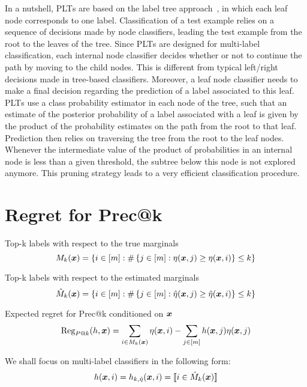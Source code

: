 \documentclass{article}
\newcommand{\Algo}[1]{\textsc{#1}}
\begin{document}
In a nutshell, \Algo{PLT}s are based on the label tree approach~\cite{Beygelzimer_et_al_2009a,Bengio_et_al_2010,Deng_et_al_2011}, in which each leaf node corresponds to one label. Classification of a test example relies on a sequence of decisions made by node classifiers, leading the test example from the root to the leaves of the tree. Since \Algo{PLT}s are designed for multi-label classification, each internal node classifier decides whether or not to continue the path by moving to the child nodes. This is different from typical left/right decisions made in tree-based classifiers.  Moreover, a leaf node classifier needs to make a final decision regarding the prediction of a label associated to this leaf. \Algo{PLT}s use a class probability estimator in each node of the tree, such that an estimate of the posterior probability of a label associated with a leaf is given by the product of the probability estimates on the path from the root to that leaf. Prediction then relies on traversing the tree from the root to the leaf nodes. Whenever the intermediate value of the product of probabilities in an internal node is less than a given threshold, the subtree below this node is not explored anymore. This pruning strategy leads to a very efficient classification procedure. %


\newpage






\appendix

\onecolumn

\section{Regret for Prec@k}
Top-k labels with respect to the true marginals
\[
M_k(\boldsymbol{x}) = \left\{ i\in [m] : \# \left\{ j \in [m] : \eta(\boldsymbol{x}, j) \ge \eta(\boldsymbol{x}, i)  \right\} \le k\right\}
\]

Top-k labels with respect to the estimated marginals
\[
\hat{M}_k(\boldsymbol{x}) = \left\{ i\in [m] : \# \left\{ j \in [m] : \hat{\eta}(\boldsymbol{x}, j) \ge \hat{\eta}(\boldsymbol{x}, i)  \right\} \le k\right\}
\]


Expected regret for Prec@k conditioned on $\boldsymbol{x}$ 
\[
\mbox{Reg}_{P@k} (h, \boldsymbol{x}) = \sum_{i \in M_k(\boldsymbol{x})} \eta (\boldsymbol{x} ,i ) - \sum_{j \in [m]} h(\boldsymbol{x}, j) \eta(\boldsymbol{x} , j )
\]

We shall focus on multi-label classifiers in the following form:
\[
h(\boldsymbol{x},i) =h_{k, \hat{\eta}}(\boldsymbol{x},i) = \llbracket \textstyle i \in \hat{M}_k(\boldsymbol{x})  \rrbracket
\]
\end{document}
